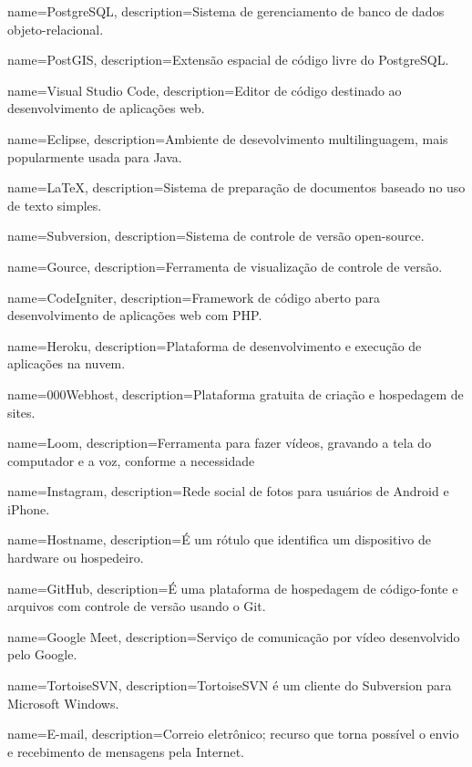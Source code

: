  {
    name=PostgreSQL,
    description={Sistema de gerenciamento de banco de dados objeto-relacional.}
}

 {
    name=PostGIS,
    description={Extensão espacial de código livre do \gls{PostgreSQL}.}
}

 {
    name=Visual Studio Code,
    description={Editor de código destinado ao desenvolvimento de aplicações web.}
}

 {
    name=Eclipse,
    description={Ambiente de desevolvimento multilinguagem, mais popularmente usada para Java.}
}

 {
    name=\LaTeX,
    description={Sistema de preparação de documentos baseado no uso de texto simples.}
}

 {
    name=Subversion,
    description={Sistema de controle de versão open-source.}
}

 {
    name=Gource,
    description={Ferramenta de visualização de controle de versão.}
}

 {
    name=CodeIgniter,
    description={Framework de código aberto para desenvolvimento de aplicações web com \ac{PHP}.}
}

 {
    name=Heroku,
    description={Plataforma de desenvolvimento e execução de aplicações na nuvem.}
}

 {
    name=000Webhost,
    description={Plataforma gratuita de criação e hospedagem de sites.}
}

 {
    name=Loom,
    description={Ferramenta para fazer vídeos, gravando a tela do computador e a voz, conforme a necessidade}
}

 {
    name=Instagram,
    description={Rede social de fotos para usuários de Android e iPhone.}
}

 {
    name=Hostname,
    description={É um rótulo que identifica um dispositivo de hardware ou hospedeiro.}
}

 {
    name=GitHub,
    description={É uma plataforma de hospedagem de código-fonte e arquivos com controle de versão usando o Git.}
}

 {
    name=Google Meet,
    description={Serviço de comunicação por vídeo desenvolvido pelo Google.}
}

 {
    name=TortoiseSVN,
    description={TortoiseSVN é um cliente do Subversion para Microsoft Windows.}
}

 {
    name=E-mail,
    description={Correio eletrônico; recurso que torna possível o envio e recebimento de mensagens pela Internet.}
}

